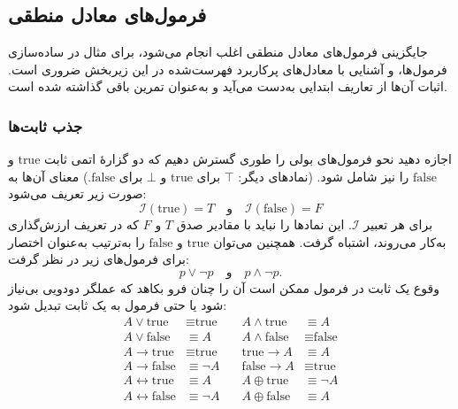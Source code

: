 \subsection*{  فرمول‌های معادل منطقی}
      جایگزینی فرمول‌های معادل منطقی اغلب انجام می‌شود، برای مثال در ساده‌سازی فرمول‌ها، و آشنایی با معادل‌های پرکاربرد فهرست‌شده در این زیربخش ضروری است. اثبات آن‌ها از تعاریف ابتدایی به‌دست می‌آید و به‌عنوان تمرین باقی گذاشته شده است.
      
      \subsubsection*{جذب ثابت‌ها }
      اجازه دهید نحو فرمول‌های بولی را طوری گسترش دهیم که دو گزارهٔ اتمی ثابت \(\text{true}\) و \(\text{false}\) را نیز شامل شود. (نمادهای دیگر: \(\top\) برای \(\text{true}\) و \(\bot\) برای \(\text{false}\).) معنای آن‌ها به صورت زیر تعریف می‌شود:
      \[
      \mathscr{I}(\text{true}) = T
      \quad\text{و}\quad
      \mathscr{I}(\text{false}) = F
      \]
      برای هر تعبیر \(\mathscr{I}\).  
      این نمادها را نباید با مقادیر صدق \(T\) و \(F\) که در تعریف ارزش‌گذاری به‌کار می‌روند، اشتباه گرفت. همچنین می‌توان \(\text{true}\) و \(\text{false}\) را به‌ترتیب به‌عنوان اختصار برای فرمول‌های زیر در نظر گرفت:
      \[
      p \lor \neg p
      \quad\text{و}\quad
      p \land \neg p.
      \]
      وقوع یک ثابت در فرمول ممکن است آن را چنان فرو بکاهد که عملگر دودویی بی‌نیاز شود یا حتی فرمول به یک ثابت تبدیل شود:
      \[
      \begin{aligned}
      A \lor \text{true} &\equiv \text{true}
      &\quad
      A \land \text{true} &\equiv A\\
      A \lor \text{false} &\equiv A
      &\quad
      A \land \text{false} &\equiv \text{false}\\
      A \to \text{true} &\equiv \text{true}
      &\quad
      \text{true} \to A &\equiv A\\
      A \to \text{false} &\equiv \neg A
      &\quad
      \text{false} \to A &\equiv \text{true}\\
      A \leftrightarrow \text{true} &\equiv A
      &\quad
      A \oplus \text{true} &\equiv \neg A\\
      A \leftrightarrow \text{false} &\equiv \neg A
      &\quad
      A \oplus \text{false} &\equiv A
      \end{aligned}
      \]
      
